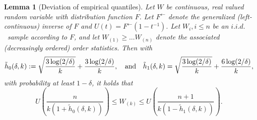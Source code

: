 \documentclass{article}
\numberwithin{equation}{section}
\newtheorem{lemma}{Lemma}[section]
\newcommand\iid{\ensuremath{\mathit{i.i.d.}}\xspace }
\begin{document}
\begin{lemma}[Deviation of empirical
quantiles]\label{lem:deviationEmpQuantiles}
    Let $W$ be  continuous, real valued random variable with
    distribution function $F$. Let $F^\leftarrow$ denote the
    generalized (left-continuous) inverse of $F$ and
    \(U(t)=F^{\leftarrow}(1-t^{-1})\).
    Let $W_i, i \le n$ be an \iid~sample according to $F$, and let $W_{(1)}\ge
    \dots W_{(n)}$ denote the associated (decreasingly ordered)
    order statistics. Then with
    \[\tilde{h}_0(\delta,k):= \sqrt{\frac{3\log(2/\delta)}{k}} +
        \frac{3\log(2/\delta)}{k},\quad\textnormal{and}\quad
        \tilde{h}_1(\delta,k) = \sqrt{\frac{3\log(2/\delta)}{k}} +
    \frac{6\log(2/\delta)}{k},\]
    with probability at least $1-\delta$, it holds that
    \begin{equation*}
        U\left(
        \frac{n}{k\left(1+\tilde{h}_0(\delta,k)\right)} \right) \leq
        W_{(k)}\leq U\left(
        \frac{n+1}{k\left(1-\tilde{h}_1(\delta,k)\right)}\right).
    \end{equation*}
\end{lemma}
%
\end{document}
